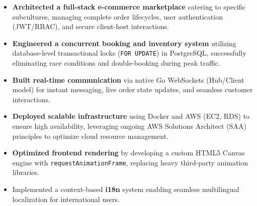 \begin{itemize}
  \item \textbf{Architected a full-stack e-commerce marketplace} catering to specific subcultures, managing complete order lifecycles, user authentication (JWT/RBAC), and secure client-host interactions.
  \item \textbf{Engineered a concurrent booking and inventory system} utilizing database-level transactional locks (\texttt{FOR UPDATE}) in PostgreSQL, successfully eliminating race conditions and double-booking during peak traffic.
  \item \textbf{Built real-time communication} via native Go WebSockets (Hub/Client model) for instant messaging, live order state updates, and seamless customer interactions.
  \item \textbf{Deployed scalable infrastructure} using Docker and AWS (EC2, RDS) to ensure high availability, leveraging ongoing AWS Solutions Architect (SAA) principles to optimize cloud resource management.
  \item \textbf{Optimized frontend rendering} by developing a custom HTML5 Canvas engine with \texttt{requestAnimationFrame}, replacing heavy third-party animation libraries.
  \item Implemented a context-based \textbf{i18n} system enabling seamless multilingual localization for international users.
\end{itemize}